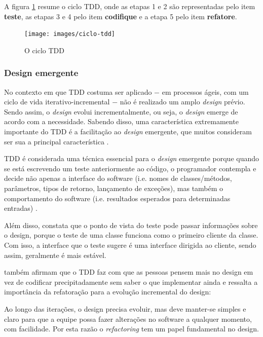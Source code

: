 A figura \ref{img:ciclo-tdd} resume o ciclo TDD, onde as etapas 1 e 2 são representadas pelo item \textbf{teste}, as etapas 3 e 4 pelo item \textbf{codifique} e a etapa 5 pelo item \textbf{refatore}.

\begin{figure}[h]
  \center
  \caption{O ciclo TDD}
  \texttt{[image: images/ciclo-tdd]}
  \label{img:ciclo-tdd}
\end{figure}


\subsubsection{Design emergente}
\label{ssub:design_emergente}

No contexto em que TDD costuma ser aplicado $-$ em processos ágeis, com um ciclo de vida iterativo-incremental $-$ não é realizado um amplo \textit{design} prévio. Sendo assim, o \textit{design} evolui incrementalmente, ou seja, o \textit{design} emerge de acordo com a necessidade. Sabendo disso, uma característica extremamente importante do TDD é a facilitação ao \textit{design} emergente, que muitos consideram ser sua a principal característica \cite{EmergentDesign}.

TDD é considerada uma técnica essencial para o \textit{design} emergente porque
quando se está escrevendo um teste anteriormente ao código, o programador contempla e decide não apenas a interface do software (i.e. nomes de classes/métodos, parâmetros, tipos de retorno, lançamento de exceções), mas também o comportamento do software (i.e. resultados esperados para determinadas entradas) \cite{JanzenTDD}.

Além disso,  constata que o ponto de vista do teste pode passar informações sobre o design, porque o teste de uma classe funciona como o primeiro cliente da classe. Com isso, a interface que o teste sugere é uma interface dirigida ao cliente, sendo assim, geralmente é mais estável.

 também afirmam que o TDD faz com que as pessoas pensem mais no design em vez de codificar precipitadamente sem saber o que implementar ainda e  ressalta a importância da refatoração para a evolução incremental do design:

\begin{citacao}
Ao longo das iterações, o design precisa evoluir, mas deve manter-se simples e claro para que a equipe possa fazer alterações no software a qualquer momento, com facilidade. Por esta razão o \textit{refactoring} tem um papel fundamental no design.
\end{citacao}


